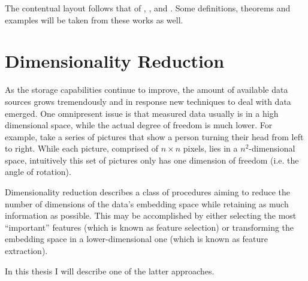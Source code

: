 The contentual layout follows that of \cite{Coifman20065}, \cite{Nadler2006113}, \cite{Nadler2008} and \cite{Belkin2003}. Some definitions, theorems and examples will be taken from these works as well.

\section{Dimensionality Reduction}
As the storage capabilities continue to improve, the amount of available data sources grows tremendously and in response new techniques to deal with data emerged. One omnipresent issue is that measured data usually is in a high dimensional space, while the actual degree of freedom is much lower. For example, take a series of pictures that show a person turning their head from left to right. While each picture, comprised of $n\times n$ pixels, lies in a $n^2$-dimensional space, intuitively this set of pictures only has one dimension of freedom (i.e. the angle of rotation).

Dimensionality reduction describes a class of procedures aiming to reduce the number of dimensions of the data's embedding space while retaining as much information as possible. This may be accomplished by either selecting the most ``important'' features (which is known as feature selection) or transforming the embedding space in a lower-dimensional one (which is known as feature extraction).

In this thesis I will describe one of the latter approaches.